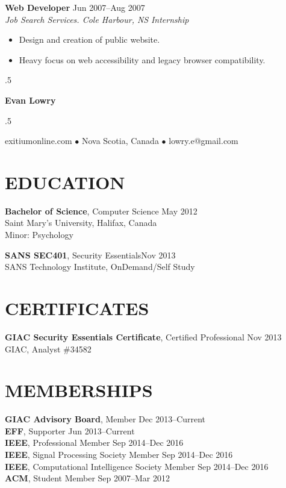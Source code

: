 \documentclass[line,margin]{res}
\begin{document}
\begin{resume}
\textbf{Web Developer} \hfill Jun 2007--Aug 2007 \\
\textit{Job Search Services. Cole Harbour, NS} \hfill \textit{Internship}
\begin{itemize} \itemsep-2pt
    \item Design and creation of public website.
    \item Heavy focus on web accessibility and legacy browser compatibility.
\end{itemize}
\end{resume}
\clearpage

\moveleft.5\hoffset\centerline{\LARGE\bf Evan Lowry}
\moveleft.5\hoffset\centerline{exitiumonline.com   {$\bullet$}   Nova Scotia, Canada {$\bullet$}   lowry.e@gmail.com}

\begin{resume}
\section{EDUCATION}
\textbf{Bachelor of Science}, Computer Science \hfill May 2012 \\
Saint Mary's University, Halifax, Canada \\
Minor: Psychology

\textbf{SANS SEC401}, Security Essentials\hfill Nov 2013 \\
SANS Technology Institute, OnDemand/Self Study

\section{CERTIFICATES}
\textbf{GIAC Security Essentials Certificate}, Certified Professional \hfill Nov 2013 \\
GIAC, Analyst \#34582

\section{MEMBERSHIPS}
\textbf{GIAC Advisory Board}, Member \hfill Dec 2013--Current \\
\textbf{EFF}, Supporter \hfill Jun 2013--Current \\
\textbf{IEEE}, Professional Member \hfill Sep 2014--Dec 2016 \\
\textbf{IEEE}, Signal Processing Society Member \hfill Sep 2014--Dec 2016 \\
\textbf{IEEE}, Computational Intelligence Society Member \hfill Sep 2014--Dec 2016 \\
\textbf{ACM}, Student Member \hfill Sep 2007--Mar 2012


\end{resume}
\end{document}
